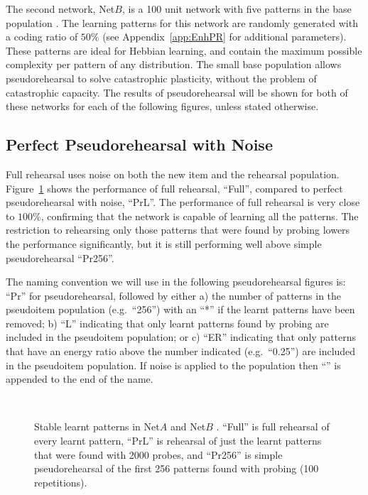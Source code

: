 The second network, Net$B$, is a 100 unit network with five patterns in the base population .  The learning patterns for this network are randomly generated with a coding ratio of $50\%$ (see Appendix~\ref{app:EnhPR} for additional parameters).  These patterns are ideal for Hebbian learning, and contain the maximum possible complexity per pattern of any distribution.  The small base population allows pseudorehearsal to solve catastrophic plasticity, without the problem of catastrophic capacity. The results of pseudorehearsal will be shown for both of these networks for each of the following figures, unless stated otherwise.

\subsection{Perfect Pseudorehearsal with Noise}

Full rehearsal uses noise on both the new item and the rehearsal population.  Figure~\ref{fig:Real-probing} shows the performance of full rehearsal, ``Full'', compared to perfect pseudorehearsal with noise, ``PrL\noiseConst{}''.  The performance of full rehearsal is very close to $100\%$, confirming that the network is capable of learning all the patterns.  The restriction to rehearsing only those patterns that were found by probing lowers the performance significantly, but it is still performing well above simple pseudorehearsal ``Pr256''.  

The naming convention we will use in the following pseudorehearsal figures is: ``Pr'' for pseudorehearsal, followed by either a) the number of patterns in the pseudoitem population (e.g.\ ``256'') with an ``*'' if the learnt patterns have been removed; b) ``L'' indicating that only learnt patterns found by probing are included in the pseudoitem population; or c) ``ER'' indicating that only patterns that have an energy ratio above the number indicated (e.g.\ ``0.25'') are included in the pseudoitem population.  If noise is applied to the population then ``\noiseConst{}'' is appended to the end of the name.

\begin{figure}[p]
\center
\small
	
	\vspace{1cm}\\
	
	\caption{Stable learnt patterns in Net$A$  and Net$B$ . ``Full'' is full rehearsal of every learnt pattern, ``PrL\noiseConst{}'' is rehearsal of just the learnt patterns that were found with 2000 probes, and ``Pr256'' is simple pseudorehearsal of the first 256 patterns found with probing (100 repetitions).}
	\label{fig:Real-probing}
\end{figure}

